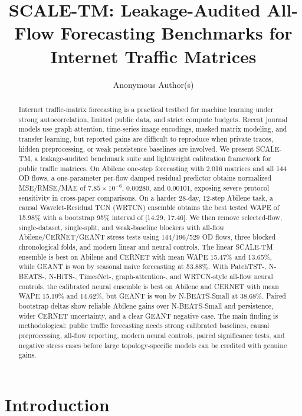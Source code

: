 \documentclass{article}
\title{SCALE-TM: Leakage-Audited All-Flow Forecasting Benchmarks for Internet Traffic Matrices}
\author{Anonymous Author(s)}
\begin{document}
\maketitle

\begin{abstract}
Internet traffic-matrix forecasting is a practical testbed for machine learning under strong autocorrelation, limited public data, and strict compute budgets. Recent journal models use graph attention, time-series image encodings, masked matrix modeling, and transfer learning, but reported gains are difficult to reproduce when private traces, hidden preprocessing, or weak persistence baselines are involved. We present SCALE-TM, a leakage-audited benchmark suite and lightweight calibration framework for public traffic matrices. On Abilene one-step forecasting with 2,016 matrices and all 144 OD flows, a one-parameter per-flow damped residual predictor obtains normalized MSE/RMSE/MAE of $7.85{\times}10^{-6}$, 0.00280, and 0.00101, exposing severe protocol sensitivity in cross-paper comparisons. On a harder 28-day, 12-step Abilene task, a causal Wavelet-Residual TCN (WRTCN) ensemble obtains the best tested WAPE of 15.98\% with a bootstrap 95\% interval of [14.29, 17.46]. We then remove selected-flow, single-dataset, single-split, and weak-baseline blockers with all-flow Abilene/CERNET/GEANT stress tests using 144/196/529 OD flows, three blocked chronological folds, and modern linear and neural controls. The linear SCALE-TM ensemble is best on Abilene and CERNET with mean WAPE 15.47\% and 13.65\%, while GEANT is won by seasonal naive forecasting at 53.88\%. With PatchTST-, N-BEATS-, N-HiTS-, TimesNet-, graph-attention-, and WRTCN-style all-flow neural controls, the calibrated neural ensemble is best on Abilene and CERNET with mean WAPE 15.19\% and 14.62\%, but GEANT is won by N-BEATS-Small at 38.68\%. Paired bootstrap deltas show reliable Abilene gains over N-BEATS-Small and persistence, wider CERNET uncertainty, and a clear GEANT negative case. The main finding is methodological: public traffic forecasting needs strong calibrated baselines, causal preprocessing, all-flow reporting, modern neural controls, paired significance tests, and negative stress cases before large topology-specific models can be credited with genuine gains.
\end{abstract}

\section{Introduction}
\end{document}
